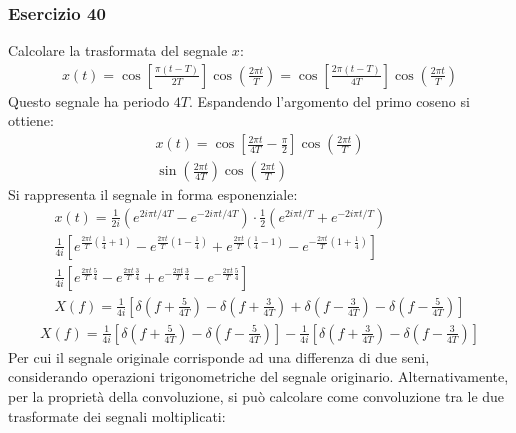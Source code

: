 \documentclass{article}
\begin{document}
\subsubsection*{Esercizio 40}

Calcolare la trasformata del segnale $x$:
\begin{gather*}
    x(t)=\cos\left[\displaystyle\frac{\pi(t-T)}{2T}\right]\cos\left(\frac{2\pi t}{T}\right)=\cos\left[\displaystyle\frac{2\pi(t-T)}{4T}\right]\cos\left(\frac{2\pi t}{T}\right)
\end{gather*}
Questo segnale ha periodo $4T$. Espandendo l'argomento del primo coseno si ottiene:
\begin{gather*}
    x(t)=\displaystyle\cos\left[\frac{2\pi t}{4T}-\frac{\pi}{2}\right]\cos\left(\frac{2\pi t}{T}\right)\\
    \sin\left(\displaystyle\frac{2\pi t}{4T}\right)\cos\left(\frac{2\pi t}{T}\right)
\end{gather*}
Si rappresenta il segnale in forma esponenziale:
\begin{gather*}
    x(t)=\displaystyle\frac{1}{2i}\left(e^{2i\pi t/4T}-e^{-2i\pi t/4T}\right)\cdot\displaystyle\frac{1}{2}\left(e^{2i\pi t/T}+e^{-2i\pi t/T}\right)\\
    \displaystyle\frac{1}{4i}\left[e^{\frac{2\pi t}{T}\left(\frac{1}{4}+1\right)}-e^{\frac{2\pi t}{T}\left(1-\frac{1}{4}\right)}+e^{\frac{2\pi t}{T}\left(\frac{1}{4}-1\right)}-e^{-\frac{2\pi t}{T}\left(1+\frac{1}{4}\right)}\right]\\
    \displaystyle\frac{1}{4i}\left[e^{\frac{2\pi t}{T}\frac{5}{4}}-e^{\frac{2\pi t}{T}\frac{3}{4}}+e^{-\frac{2\pi t}{T}\frac{3}{4}}-e^{-\frac{2\pi t}{T}\frac{5}{4}}\right]\\
    X(f)=\displaystyle\frac{1}{4i}\left[\delta\left(f+\frac{5}{4T}\right)-\delta\left(f+\frac{3}{4T}\right)+\delta\left(f-\frac{3}{4T}\right)-\delta\left(f-\frac{5}{4T}\right)\right]
\end{gather*}
\begin{gather}
    X(f)=\displaystyle\frac{1}{4i}\left[\delta\left(f+\frac{5}{4T}\right)-\delta\left(f-\frac{5}{4T}\right)\right]-\frac{1}{4i}\left[\delta\left(f+\frac{3}{4T}\right)-\delta\left(f-\frac{3}{4T}\right)\right]
\end{gather}
Per cui il segnale originale corrisponde ad una differenza di due seni, considerando operazioni trigonometriche del segnale originario. Alternativamente, per la 
proprietà della convoluzione, si può calcolare come convoluzione tra le due trasformate dei segnali moltiplicati:
\end{document}
